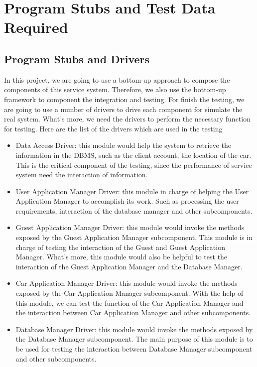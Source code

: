 \documentclass{article}
\begin{document}
	
	\newpage
	
	
	
	\section{Program Stubs and Test Data Required}
	
	\subsection{Program Stubs and Drivers}
	In this project, we are going to use a bottom-up approach to compose the components of this service system. Therefore, we also use the bottom-up framework to component the integration and testing.
	\newline
	For finish the testing, we are going to use a number of drivers to drive each component for simulate the real system. What's more, we need the drivers to perform the necessary function for testing. 
	\newline
	Here are the list of the drivers which are used in the testing
		\begin{itemize}
			\item Data Access Driver: this module would help the system to retrieve the information in the DBMS, such as the client account, the location of the car. This is the critical component of the testing, since the performance of service system need the interaction of information. 
			\item User Application Manager Driver: this module in charge of helping the User Application Manager to accomplish its work. Such as processing the user requirements, interaction of the database manager and other subcomponents.
			\item Guest Application Manager Driver: this module would invoke the methods exposed by the Guest Application Manager subcomponent. This module is in charge of testing the interaction of the Guest and Guest Application Manager. What's more, this module would also be helpful to test the interaction of the Guest Application Manager and the Database Manager.
			\item Car Application Manager Driver: this module would invoke the methods exposed by the Car Application Manager subcomponent. With the help of this module, we can test the function of the Car Application Manager and the interaction between Car Application Manager and other subcomponents. 
			\item Database Manager Driver: this module would invoke the methods exposed by the Database Manager subcomponent. The main purpose of this module is to be used for testing the interaction between Database Manager subcomponent and other subcomponents.
		\end{itemize}
\end{document}
